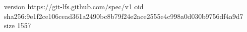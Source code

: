 version https://git-lfs.github.com/spec/v1
oid sha256:9e1f2ce106cead361a2490bc8b79f24e2ace2555e4c998a0d030b9756df4a9d7
size 1557
